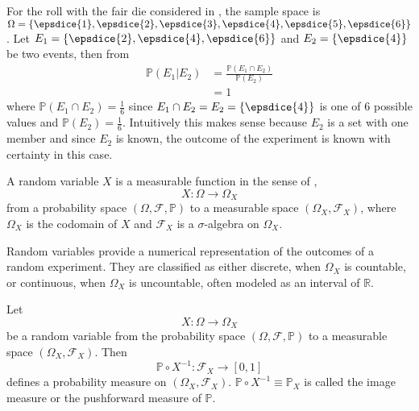 \begin{example}
	For the roll with the fair die considered in , the sample space is $\Omega = \{ \epsdice{1}, \epsdice{2}, \epsdice{3}, \epsdice{4}, \epsdice{5}, \epsdice{6} \}$. Let $E_1 = \{\epsdice{2}, \epsdice{4}, \epsdice{6}\}$ and $E_2 = \{\epsdice{4}\}$ be two events, then from 
	\begin{equation}
		\begin{split}
			\mathbb{P}(E_1|E_2) &= \frac{\mathbb{P}(E_1 \cap E_2)}{\mathbb{P}(E_2)}\\
			& = 1
		\end{split}
	\end{equation}
	where $\mathbb{P}(E_1 \cap E_2)= \frac{1}{6}$ since $E_1\cap E_2 = E_2=\{\epsdice{4}\}$ is one of $6$ possible values and $\mathbb{P}(E_2) = \frac{1}{6}$. Intuitively this makes sense because $E_2$ is a set with one member and since $E_2$ is known, the outcome of the experiment is known with certainty in this case.
\end{example}

\begin{definition}
	\label{def:random_Variable}
	A random variable $X$ is a measurable function in the sense of ,
	\begin{equation}
		X\colon \Omega \to \Omega_X
	\end{equation}
	from a probability space $(\Omega, \mathcal{F}, \mathbb{P})$ to a measurable space $(\Omega_X, \mathcal{F}_X)$, where $\Omega_X$ is the codomain of $X$ and $\mathcal{F}_X$ is a $\sigma$-algebra on $\Omega_X$.
\end{definition}

\begin{remark}
	Random variables provide a numerical representation of the outcomes of a random experiment.  
	They are classified as either discrete, when $\Omega_X$ is countable, or continuous, when $\Omega_X$ is uncountable, often modeled as an interval of $\mathbb{R}$.
\end{remark}

\begin{definition}
	\label{def:image_measure}
	Let 
	\begin{equation}
		X\colon \Omega \to \Omega_X
	\end{equation}
	be a random variable from the probability space $(\Omega, \mathcal{F}, \mathbb{P})$ to a measurable space $(\Omega_X, \mathcal{F}_X)$. Then~\cite{drewitz2019introduction}
	\begin{equation}
		\mathbb{P}\circ X^{-1}\colon \mathcal{F}_X\to [0,1]
	\end{equation}
	defines a probability measure on $(\Omega_X, \mathcal{F}_X)$. $\mathbb{P}\circ X^{-1} \equiv \mathbb{P}_X$ is called the image measure or the pushforward measure of $\mathbb{P}$.
\end{definition}

